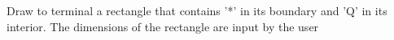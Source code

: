  Draw to terminal a rectangle that contains '*' in its boundary and 'Q' in its interior.
 The dimensions of the rectangle are input by the user
